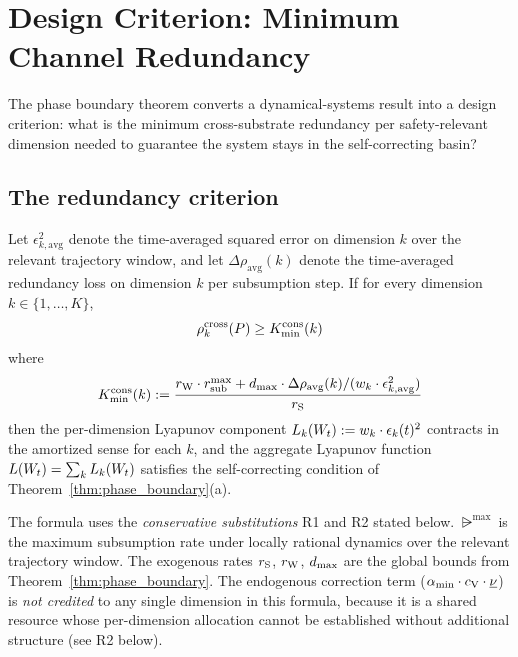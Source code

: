 \section{Design Criterion: Minimum Channel Redundancy}
\label{sec:design_criterion}

The phase boundary theorem converts a dynamical-systems result into a
design criterion: what is the minimum cross-substrate redundancy per
safety-relevant dimension needed to guarantee the system stays in the
self-correcting basin?

\subsection{The redundancy criterion}

\begin{theorem}
\label{thm:redundancy}
Let $\epsilon_{k,\mathrm{avg}}^2$ denote the time-averaged squared
error on dimension $k$ over the relevant trajectory window, and let
$\Delta\rho_{\mathrm{avg}}(k)$ denote the time-averaged redundancy
loss on dimension $k$ per subsumption step.  If for every dimension
$k \in \{1, \ldots, K\}$,
\begin{equation}
\label{eq:kmin}
\rho^{\mathrm{cross}}_k(P) \geq K_{\mathrm{min}}^{\mathrm{cons}}(k)
\end{equation}
where
\begin{equation}
\label{eq:kmin_formula}
K_{\mathrm{min}}^{\mathrm{cons}}(k) :=
  \frac{r_{\mathrm{W}} \cdot r_{\mathrm{sub}}^{\max}
    + d_{\mathrm{max}} \cdot \Delta\rho_{\mathrm{avg}}(k) /
    (w_k \cdot \epsilon_{k,\mathrm{avg}}^2)}
  {r_{\mathrm{S}}}
\end{equation}
then the per-dimension Lyapunov component $L_k(W_t) := w_k \cdot
\epsilon_k(t)^2$ contracts in the amortized sense for each $k$, and
the aggregate Lyapunov function $L(W_t) = \sum_k L_k(W_t)$
satisfies the self-correcting condition of
Theorem~\ref{thm:phase_boundary}(a).

The formula uses the \emph{conservative substitutions} R1 and R2
stated below.  $\rsub^{\max}$ is the maximum subsumption rate under
locally rational dynamics over the relevant trajectory window.  The
exogenous rates $r_{\mathrm{S}}$, $r_{\mathrm{W}}$, $d_{\mathrm{max}}$ are the global bounds from
Theorem~\ref{thm:phase_boundary}.  The endogenous correction term
($\alpha_{\min} \cdot c_{\mathrm{V}} \cdot \underline{\nu}$) is
\emph{not credited} to any single dimension in this formula, because
it is a shared resource whose per-dimension allocation cannot be
established without additional structure (see R2 below).
\end{theorem}

